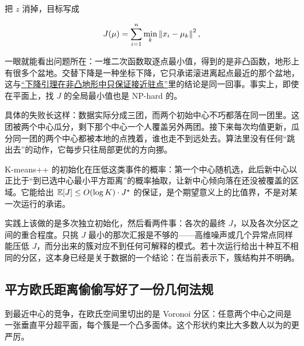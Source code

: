 把 \(z\) 消掉，目标写成

\[
J(\mu)=\sum_{i=1}^{n}\min_{k}\left\lVert x_i-\mu_k\right\rVert^2 ,
\]

一眼就能看出问题所在：一堆二次函数取逐点最小值，得到的是非凸函数，地形上有很多个盆地。交替下降是一种坐标下降，它只承诺滚进离起点最近的那个盆地，这与\hyperref[sec:09-Convex-Optimization/08-Nonconvex-and-Stochastic-Optimization/01]{``下降引理在非凸地形中只保证接近驻点''}里的结论是同一回事。事实上，即使在平面上，找 \(J\) 的全局最小值也是 NP-hard 的。

具体的失败长这样：数据实际分成三团，而两个初始中心不巧都落在同一团里。这团被两个中心瓜分，剩下那个中心一个人覆盖另外两团。接下来每次均值更新，瓜分同一团的两个中心都被本地的点拽着，谁也走不到远处去。算法里没有任何``跳出去''的动作，它每步只往局部更优的方向挪。

K-means++ 的初始化在压低这类事件的概率：第一个中心随机选，此后新中心以正比于``到已选中心最小平方距离''的概率抽取，让新中心倾向落在还没被覆盖的区域。它能给出 \(\mathbb{E}[J]\le O(\log K)\cdot J^\star\) 的保证，是个期望意义上的比值界，不是对某一次运行的承诺。

实践上该做的是多次独立初始化，然后看两件事：各次的最终 \(J\)，以及各次分区之间的重合程度。只挑 \(J\) 最小的那次汇报是不够的——高维噪声或几个异常点同样能压低 \(J\)，而分出来的簇对应不到任何可解释的模式。若十次运行给出十种互不相同的分区，这本身已经是关于数据的一个结论：在当前表示下，簇结构并不明确。

\subsection{平方欧氏距离偷偷写好了一份几何法规}

到最近中心的竞争，在欧氏空间里切出的是 Voronoi 分区：任意两个中心之间是一张垂直平分超平面，每个簇是一个凸多面体。这个形状约束比大多数人以为的更严厉。

\begin{center}
\end{center}

